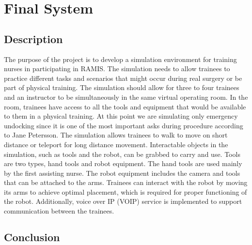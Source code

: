 \chapter*{Final System}
\section*{Description} 
The purpose of the project is to develop a simulation environment for training nurses in participating in RAMIS. The simulation needs to allow trainees to practice different tasks and scenarios that might occur during real surgery or be part of physical training.
The simulation should allow for three to four trainees and an instructor to be simultaneously in the same virtual operating room. In the room, trainees have access to all the tools and equipment that would be available to them in a physical training. At this point we are simulating only emergency undocking since it is one of the most important asks during procedure according to Jane Petersson.
The simulation allows trainees to walk to move on short distance or teleport for long distance movement. Interactable objects in the simulation, such as tools and the robot, can be grabbed to carry and use. Tools are two types, hand tools and robot equipment. The hand tools are used mainly by the first assisting nurse. The robot equipment includes the camera and tools that can be attached to the arms. Trainees can interact with the robot by moving its arms to achieve optimal placement, which is required for proper functioning of the robot. Additionally, voice over IP (VOIP) service is implemented to support communication between the trainees. 





\section*{Conclusion}
